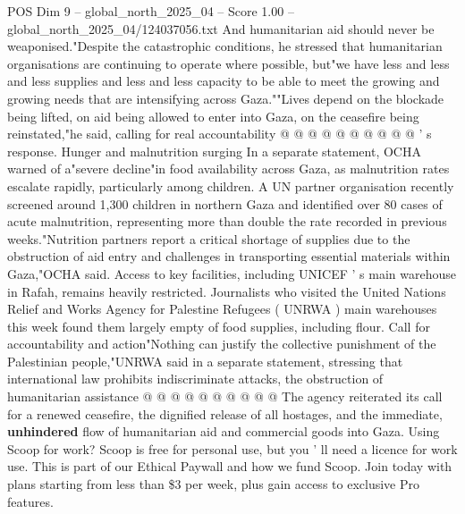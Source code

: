 \begin{textsample}{POS Dim 9 – global\_north\_2025\_04 – Score 1.00 – global\_north\_2025\_04/124037056.txt}
And humanitarian aid should never be weaponised."Despite the catastrophic conditions, he stressed that humanitarian organisations are continuing to operate where possible, but"we have less and less and less supplies and less and less capacity to be able to meet the growing and growing needs that are intensifying across Gaza.""Lives depend on the blockade being lifted, on aid being allowed to enter into Gaza, on the ceasefire being reinstated,"he said, calling for real accountability @ @ @ @ @ @ @ @ @ @ ' s response.
Hunger and malnutrition surging In a separate statement, OCHA warned of a"severe decline"in food availability across Gaza, as malnutrition rates escalate rapidly, particularly among children.
A UN partner organisation recently screened around 1,300 children in northern Gaza and identified over 80 cases of acute malnutrition, representing more than double the rate recorded in previous weeks."Nutrition partners report a critical shortage of supplies due to the obstruction of aid entry and challenges in transporting essential materials within Gaza,"OCHA said.
Access to key facilities, including UNICEF ' s main warehouse in Rafah, remains heavily restricted.
Journalists who visited the United Nations Relief and Works Agency for Palestine Refugees ( UNRWA ) main warehouses this week found them largely empty of food supplies, including flour.
Call for accountability and action"Nothing can justify the collective punishment of the Palestinian people,"UNRWA said in a separate statement, stressing that international law prohibits indiscriminate attacks, the obstruction of humanitarian assistance @ @ @ @ @ @ @ @ @ @ The agency reiterated its call for a renewed ceasefire, the dignified release of all hostages, and the immediate, \textbf{unhindered} flow of humanitarian aid and commercial goods into Gaza.
Using Scoop for work?
Scoop is free for personal use, but you ' ll need a licence for work use.
This is part of our Ethical Paywall and how we fund Scoop.
Join today with plans starting from less than \$3 per week, plus gain access to exclusive Pro features.

\end{textsample}
